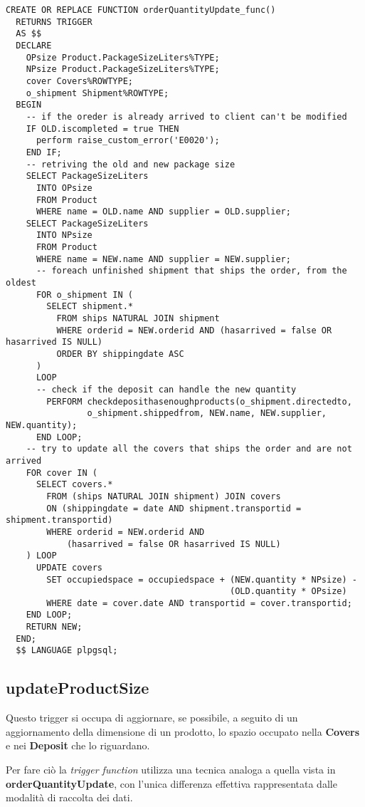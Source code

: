 \begin{lstlisting}[caption={Funzione \textbf{orderQuantityUpdate}}]
  CREATE OR REPLACE FUNCTION orderQuantityUpdate_func()
  RETURNS TRIGGER
  AS $$
  DECLARE
    OPsize Product.PackageSizeLiters%TYPE;
    NPsize Product.PackageSizeLiters%TYPE;
    cover Covers%ROWTYPE;
    o_shipment Shipment%ROWTYPE;
  BEGIN
    -- if the oreder is already arrived to client can't be modified
    IF OLD.iscompleted = true THEN
      perform raise_custom_error('E0020');
    END IF;
    -- retriving the old and new package size
    SELECT PackageSizeLiters
      INTO OPsize
      FROM Product
      WHERE name = OLD.name AND supplier = OLD.supplier;
    SELECT PackageSizeLiters
      INTO NPsize
      FROM Product
      WHERE name = NEW.name AND supplier = NEW.supplier;
      -- foreach unfinished shipment that ships the order, from the oldest
      FOR o_shipment IN (
        SELECT shipment.*
          FROM ships NATURAL JOIN shipment
          WHERE orderid = NEW.orderid AND (hasarrived = false OR hasarrived IS NULL)
          ORDER BY shippingdate ASC
      )
      LOOP
      -- check if the deposit can handle the new quantity
        PERFORM checkdeposithasenoughproducts(o_shipment.directedto, 
                o_shipment.shippedfrom, NEW.name, NEW.supplier, NEW.quantity);
      END LOOP;
    -- try to update all the covers that ships the order and are not arrived
    FOR cover IN (
      SELECT covers.* 
        FROM (ships NATURAL JOIN shipment) JOIN covers
        ON (shippingdate = date AND shipment.transportid = shipment.transportid)
        WHERE orderid = NEW.orderid AND 
            (hasarrived = false OR hasarrived IS NULL)
    ) LOOP
      UPDATE covers
        SET occupiedspace = occupiedspace + (NEW.quantity * NPsize) - 
                                            (OLD.quantity * OPsize)
        WHERE date = cover.date AND transportid = cover.transportid;
    END LOOP;
    RETURN NEW;
  END;
  $$ LANGUAGE plpgsql;
\end{lstlisting}

\subsection{\textbf{updateProductSize}}

Questo trigger si occupa di aggiornare, se possibile, a seguito di un aggiornamento della dimensione di un prodotto, lo spazio occupato nella \textbf{Covers} e nei \textbf{Deposit} che lo riguardano.

Per fare ciò la \textit{trigger function} utilizza una tecnica analoga a quella vista in \textbf{orderQuantityUpdate}, con l'unica differenza effettiva rappresentata dalle modalità di raccolta dei dati.

